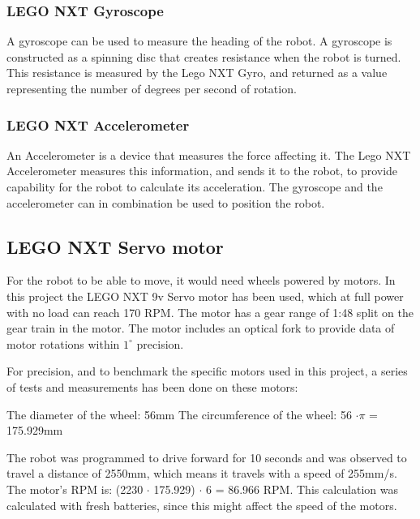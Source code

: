\subsubsection{LEGO NXT Gyroscope}
\label{sec:LEGO NXT Gyroscope}
A gyroscope can be used to measure the heading of the robot. A gyroscope is constructed as a spinning disc that creates resistance when the robot is turned. This resistance is measured by the Lego NXT Gyro, and returned as a value representing the number of degrees per second of rotation.

\subsubsection{LEGO NXT Accelerometer}
\label{sec:LEGO NXT Accelerometer}
An Accelerometer is a device that measures the force affecting it. The Lego NXT Accelerometer measures this information, and sends it to the robot, to provide capability for the robot to calculate its acceleration. The gyroscope and the accelerometer can in combination be used to position the robot. 

\subsection{LEGO NXT Servo motor}
\label{sec:LEGO NXT Servo motor}
For the robot to be able to move, it would need wheels powered by motors. In this project the LEGO NXT 9v Servo motor has been used, which at full power with no load can reach 170 RPM. The motor has a gear range of 1:48 split on the gear train in the motor. \citep{Servo} The motor includes an optical fork to provide data of motor rotations within \(1^{\circ}\) precision.

For precision, and to benchmark the specific motors used in this project, a series of tests and measurements has been done on these motors:

The diameter of the wheel: 56mm \newline
The circumference of the wheel: 56 \begin{math}\cdot \pi \end{math} = 175.929mm

The robot was programmed to drive forward for 10 seconds and was observed to travel a distance of 2550mm, which means it travels with a speed of 255mm/s. \newline
The motor’s RPM is: (2230 \begin{math} \cdot \end{math} 175.929) \begin{math} \cdot \end{math} 6 = 86.966 RPM. 
This calculation was calculated with fresh batteries, since this might affect the speed of the motors.

